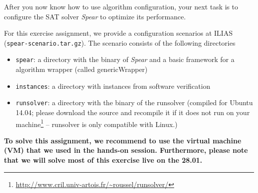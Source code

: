 \documentclass{exam}
\begin{document}
After you now know how to use algorithm configuration,
your next task is to configure the SAT solver \textit{Spear} to optimize its performance.   

\bigskip

For this exercise assignment, 
we provide a configuration scenarios at ILIAS (\texttt{spear-scenario.tar.gz}).
The scenario consists of the following directories
\begin{itemize}
  \item \texttt{spear}: a directory with the binary of \textit{Spear} and a basic framework for a algorithm wrapper (called genericWrapper)
  \item \texttt{instances}: a directory with instances from software verification
  \item \texttt{runsolver}: a directory with the binary of the runsolver (compiled for Ubuntu 14.04; please download the source and recompile it if it does not run on your machine\footnote{\url{http://www.cril.univ-artois.fr/~roussel/runsolver/}} -- runsolver is only compatible with Linux.)
\end{itemize}

\textbf{To solve this assignment, we recommend to use the virtual machine (VM) that we used in the hands-on session. Furthermore, please note that we will solve most of this exercise live on the 28.01.} 
\end{document}
